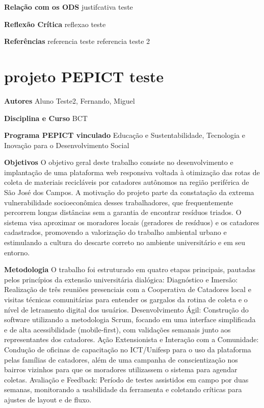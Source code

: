 \documentclass[12pt,openright,oneside,a4paper]{report}
\begin{document}
\vspace{0.7cm}
\noindent
\textbf{Relação com os ODS}
justifcativa teste

\vspace{0.7cm}
\noindent
\textbf{Reflexão Crítica}
reflexao teste

\vspace{0.7cm}
\noindent
\textbf{Referências}
referencia teste
referencia teste 2

\vspace{0.7cm}
\newpage
\section{projeto PEPICT teste}
\noindent
\textbf{Autores}
Aluno Teste2, Fernando, Miguel

\vspace{0.7cm}
\noindent
\textbf{Disciplina e Curso}
BCT

\vspace{0.7cm}
\noindent
\textbf{Programa PEPICT vinculado}
Educação e Sustentabilidade, Tecnologia e Inovação para o Desenvolvimento Social

\vspace{0.7cm}
\noindent
\textbf{Objetivos}
O objetivo geral deste trabalho consiste no desenvolvimento e implantação de uma plataforma web
responsiva voltada à otimização das rotas de coleta de materiais recicláveis por catadores autônomos
na região periférica de São José dos Campos. A motivação do projeto parte da constatação da extrema
vulnerabilidade socioeconômica desses trabalhadores, que frequentemente percorrem longas distâncias
sem a garantia de encontrar resíduos triados. O sistema visa aproximar os moradores locais (geradores
de resíduos) e os catadores cadastrados, promovendo a valorização do trabalho ambiental urbano e
estimulando a cultura do descarte correto no ambiente universitário e em seu entorno.

\vspace{0.7cm}
\noindent
\textbf{Metodologia}
O trabalho foi estruturado em quatro etapas principais, pautadas pelos princípios da extensão
universitária dialógica:
Diagnóstico e Imersão: Realização de três reuniões presenciais com a Cooperativa de Catadores
local e visitas técnicas comunitárias para entender os gargalos da rotina de coleta e o nível de
letramento digital dos usuários.
Desenvolvimento Ágil: Construção do software utilizando a metodologia Scrum, focando em uma
interface simplificada e de alta acessibilidade (mobile-first), com validações semanais junto aos
representantes dos catadores.
Ação Extensionista e Interação com a Comunidade: Condução de oficinas de capacitação no
ICT/Unifesp para o uso da plataforma pelas famílias de catadores, além de uma campanha de
conscientização nos bairros vizinhos para que os moradores utilizassem o sistema para agendar
coletas.
Avaliação e Feedback: Período de testes assistidos em campo por duas semanas, monitorando a
usabilidade da ferramenta e coletando críticas para ajustes de layout e de fluxo.
\end{document}
